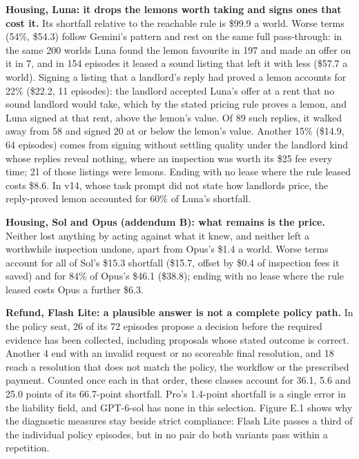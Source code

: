 \textbf{Housing, Luna: it drops the lemons worth taking and signs ones that cost it.} Its shortfall relative to the
reachable rule is \$99.9 a world. Worse terms (54\%, \$54.3) follow Gemini's pattern and rest on the same full pass-through: in the same 200 worlds Luna found
the lemon favourite in 197 and made an offer on it in 7, and in 154 episodes it leased a sound listing that left it
with less (\$57.7 a world). Signing a listing that a landlord's reply had proved a lemon accounts for 22\% (\$22.2,
11 episodes): the landlord accepted Luna's offer at a rent that no sound landlord would take, which by the stated
pricing rule proves a lemon, and Luna signed at that rent, above the lemon's value. Of 89 such replies, it walked away
from 58 and signed 20 at or below the lemon's value. Another 15\% (\$14.9, 64 episodes) comes from signing without
settling quality under the landlord kind whose replies reveal nothing, where an inspection was worth its \$25 fee every
time; 21 of those listings were lemons. Ending with no lease where the rule leased costs \$8.6. In v14, whose task
prompt did not state how landlords price, the reply-proved lemon accounted for 60\% of Luna's shortfall.

\textbf{Housing, Sol and Opus (addendum B): what remains is the price.} Neither lost anything by acting against what it
knew, and neither left a worthwhile inspection undone, apart from Opus's \$1.4 a world. Worse terms account for all of
Sol's \$15.3 shortfall (\$15.7, offset by \$0.4 of inspection fees it saved) and for 84\% of Opus's \$46.1 (\$38.8); ending
with no lease where the rule leased costs Opus a further \$6.3.

\textbf{Refund, Flash Lite: a plausible answer is not a complete policy path.} In the policy seat, 26 of its 72 episodes
propose a decision before the required evidence has been collected, including proposals whose stated outcome is
correct. Another 4 end with an invalid request or no scoreable final resolution, and 18 reach a resolution that
does not match the policy, the workflow or the prescribed payment. Counted once each in that order, these classes
account for 36.1, 5.6 and 25.0 points of its 66.7-point shortfall. Pro's 1.4-point shortfall is a single error in the
liability field, and GPT-6-sol has none in this selection. Figure E.1 shows why the diagnostic measures stay beside
strict compliance: Flash Lite passes a third of the individual policy episodes, but in no pair do both variants pass
within a repetition.

